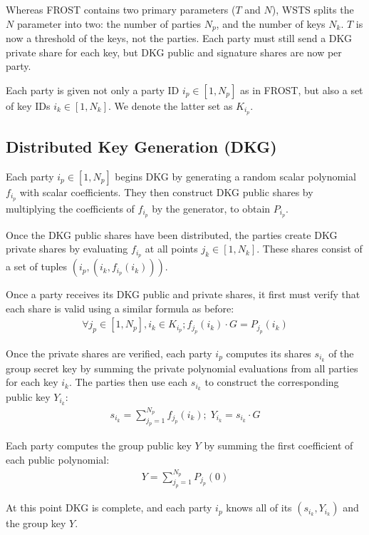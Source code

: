 \documentclass{article}
\begin{document}
Whereas FROST contains two primary parameters ($T$ and $N$), WSTS splits the $N$ parameter into two: the number of parties $N_p$, and the number of keys $N_k$.  $T$ is now a threshold of the keys, not the parties.  Each party must still send a DKG private share for each key, but DKG public and signature shares are now per party.

Each party is given not only a party ID $i_p \in [1, N_p]$ as in FROST, but also a set of key IDs $i_k \in [1, N_k]$.  We denote the latter set as $K_{i_p}$.

\subsection{
  Distributed Key Generation (DKG)
}

Each party $i_p \in [1, N_p]$ begins DKG by generating a random scalar polynomial $f_{i_p}$ with scalar coefficients.  They then construct DKG public shares by multiplying the coefficients of $f_{i_p}$ by the generator, to obtain $P_{i_p}$.

Once the DKG public shares have been distributed, the parties create DKG private shares by evaluating $f_{i_p}$ at all points $j_k \in [1, N_k]$.  These shares consist of a set of tuples $(i_p, (i_k, f_{i_p}(i_k)))$.

Once a party receives its DKG public and private shares, it first must verify that each share is valid using a similar formula as before:
\begin{align}
  \forall j_p \in [1,N_p], i_k \in K_{i_p}; f_{j_p}(i_k) \cdot G = P_{j_p}(i_k)
\end{align}

Once the private shares are verified, each party $i_p$ computes its shares $s_{i_k}$ of the group secret key by summing the private polynomial evaluations from all parties for each key $i_k$. The parties then use each $s_{i_k}$ to construct the corresponding public key $Y_{i_k}$:
\begin{align}
  s_{i_k} = \sum_{j_p = 1}^{N_p} f_{j_p}(i_k) ;\; Y_{i_k} = s_{i_k} \cdot G
\end{align}

Each party computes the group public key $Y$ by summing the first coefficient of each public polynomial:
\begin{align}
  Y = \sum_{j_p=1}^{N_p} P_{j_p}(0)
\end{align}

At this point DKG is complete, and each party $i_p$ knows all of its $(s_{i_k}, Y_{i_k})$ and the group key $Y$.
\end{document}
